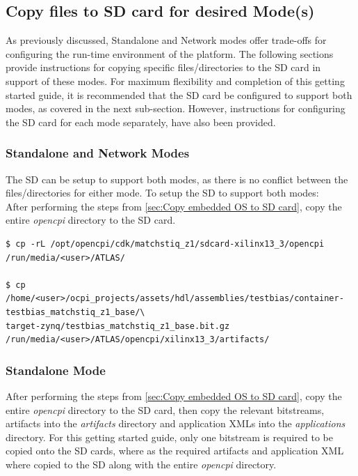 \subsection{Copy files to SD card for desired Mode(s)}
As previously discussed, Standalone and Network modes offer trade-offs for configuring the run-time environment of the platform. The following sections provide instructions for copying specific files/directories to the SD card in support of these modes. For maximum flexibility and completion of this getting started guide, it is recommended that the SD card be configured to support both modes, as covered in the next sub-section. However, instructions for configuring the SD card for each mode separately, have also been provided.

\subsubsection{Standalone and Network Modes}
The SD can be setup to support both modes, as there is no conflict between the files/directories for either mode. To setup the SD to support both modes:\\

\noindent After performing the steps from \ref{sec:Copy embedded OS to SD card}, copy the entire \textit{opencpi} directory to the SD card.

\begin{verbatim}
$ cp -rL /opt/opencpi/cdk/matchstiq_z1/sdcard-xilinx13_3/opencpi /run/media/<user>/ATLAS/

$ cp /home/<user>/ocpi_projects/assets/hdl/assemblies/testbias/container-testbias_matchstiq_z1_base/\
target-zynq/testbias_matchstiq_z1_base.bit.gz /run/media/<user>/ATLAS/opencpi/xilinx13_3/artifacts/
\end{verbatim}

\subsubsection{Standalone Mode}
After performing the steps from \ref{sec:Copy embedded OS to SD card}, copy the entire \textit{opencpi} directory to the SD card, then copy the relevant bitstreams, artifacts into the \textit{artifacts} directory and application XMLs into the \textit{applications} directory. For this getting started guide, only one bitstream is required to be copied onto the SD cards, where as the required artifacts and application XML where copied to the SD along with the entire \textit{opencpi} directory.


